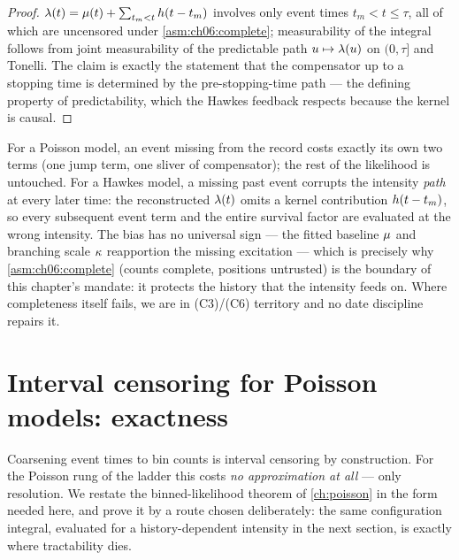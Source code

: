 \begin{proof}
$\lambda(t) = \mu(t) + \sum_{t_m < t}h(t - t_m)$ involves only event
times $t_m < t \le \tau$, all of which are uncensored under
\cref{asm:ch06:complete}; measurability of the integral follows from joint
measurability of the predictable path $u \mapsto \lambda(u)$ on $(0,\tau]$ and
Tonelli. The claim is exactly the statement that the compensator up to a
stopping time is determined by the pre-stopping-time path --- the defining
property of predictability, which the Hawkes feedback respects because the
kernel is causal.
\end{proof}

\begin{warning}\label{warn:ch06:missingpast}
For a Poisson model, an event missing from the record costs exactly its own
two terms (one jump term, one sliver of compensator); the rest of the
likelihood is untouched. For a Hawkes model, a missing past event corrupts
the intensity \emph{path} at every later time: the reconstructed
$\lambda(t)$ omits a kernel contribution $h(t - t_m)$, so every
subsequent event term and the entire survival factor are evaluated at the
wrong intensity. The bias has no universal sign --- the fitted baseline
$\mu$ and branching scale $\kappa$ reapportion the missing excitation ---
which is precisely why \cref{asm:ch06:complete} (counts complete, positions
untrusted) is the boundary of this chapter's mandate: it protects the
history that the intensity feeds on. Where completeness itself fails, we
are in (C3)/(C6) territory and no date discipline repairs it.
\end{warning}

\section{Interval censoring for Poisson models: exactness}\label{ch06:sec:icpoisson}

Coarsening event times to bin counts is interval censoring by construction.
For the Poisson rung of the ladder this costs \emph{no approximation at
all} --- only resolution. We restate the binned-likelihood theorem of
\cref{ch:poisson} in the form needed here, and prove it by a route chosen
deliberately: the same configuration integral, evaluated for a
history-dependent intensity in the next section, is exactly where
tractability dies.

